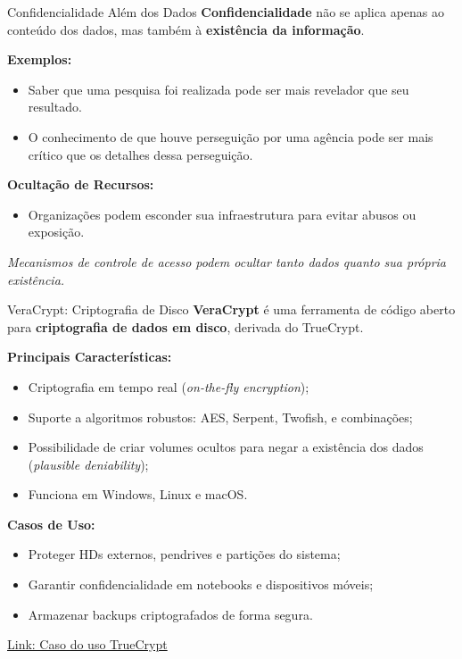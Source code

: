 \begin{frame}{Confidencialidade Além dos Dados}
    \textbf{Confidencialidade} não se aplica apenas ao conteúdo dos dados, mas também à \textbf{existência da informação}.

    \vspace{0.3cm}
    \textbf{Exemplos:}
    \begin{itemize}
        \item Saber que uma pesquisa foi realizada pode ser mais revelador que seu resultado.
        \item O conhecimento de que houve perseguição por uma agência pode ser mais crítico que os detalhes dessa perseguição.
    \end{itemize}

    \vspace{0.3cm}
    \textbf{Ocultação de Recursos:}
    \begin{itemize}
        \item Organizações podem esconder sua infraestrutura para evitar abusos ou exposição.
        
    \end{itemize}

    \vspace{0.3cm}
    \textit{Mecanismos de controle de acesso podem ocultar tanto dados quanto sua própria existência.}
\end{frame}

\begin{frame}{VeraCrypt: Criptografia de Disco}
    \textbf{VeraCrypt} é uma ferramenta de código aberto para \textbf{criptografia de dados em disco}, derivada do TrueCrypt.

    \vspace{0.3cm}
    \textbf{Principais Características:}
    \begin{itemize}
        \item Criptografia em tempo real (\textit{on-the-fly encryption});
        \item Suporte a algoritmos robustos: AES, Serpent, Twofish, e combinações;
        \item Possibilidade de criar volumes ocultos para negar a existência dos dados (\textit{plausible deniability});
        \item Funciona em Windows, Linux e macOS.
    \end{itemize}

    \vspace{0.3cm}
    \textbf{Casos de Uso:}
    \begin{itemize}
        \item Proteger HDs externos, pendrives e partições do sistema;
        \item Garantir confidencialidade em notebooks e dispositivos móveis;
        \item Armazenar backups criptografados de forma segura.
    \end{itemize}

\href{https://g1.globo.com/politica/noticia/2010/06/nem-fbi-consegue-decifrar-arquivos-de-daniel-dantas-diz-jornal.html}{Link: Caso do uso TrueCrypt}
\end{frame}




